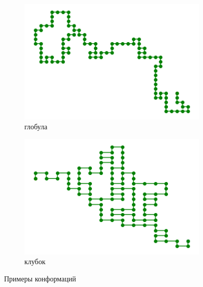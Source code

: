 \begin{figure}[h]
	\centering
    \begin{subfigure}{0.45\textwidth}
        \includegraphics[width=\textwidth]{../images/loose_conf.png}
        \caption{глобула}
    \end{subfigure}
    \begin{subfigure}{0.45\textwidth}
	    \includegraphics[width=\textwidth]{../images/dense_conf.png}
        \caption{клубок}
    \end{subfigure} 
	\caption{Примеры конформаций}
    \label{fig::globule_coil_example}
\end{figure}


